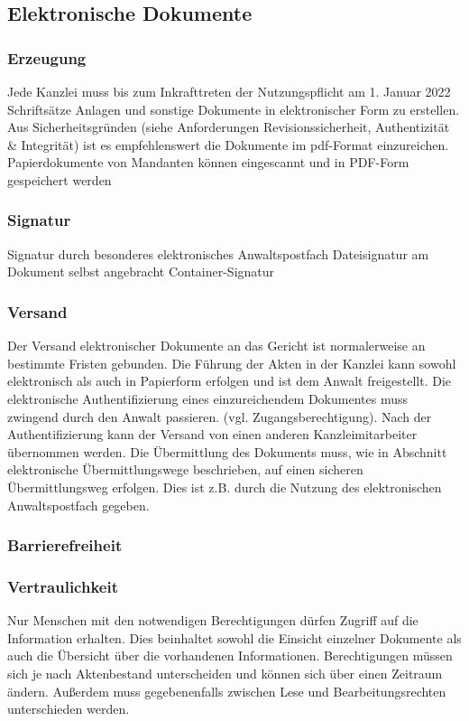 \subsection{Elektronische Dokumente}
\subsubsection*{Erzeugung}
Jede Kanzlei muss bis zum Inkrafttreten der Nutzungspflicht am 1. Januar 2022 Schriftsätze Anlagen und sonstige Dokumente in elektronischer Form zu erstellen. Aus Sicherheitsgründen (siehe Anforderungen Revisionssicherheit, Authentizität \& Integrität) ist es empfehlenswert die Dokumente im pdf-Format einzureichen.  Papierdokumente von Mandanten können eingescannt und in PDF-Form gespeichert werden


\subsubsection*{Signatur}
Signatur durch besonderes elektronisches Anwaltspostfach
Dateisignatur am Dokument selbst angebracht
Container-Signatur
\subsubsection*{Versand}
Der Versand elektronischer Dokumente an das Gericht ist normalerweise an bestimmte Fristen gebunden.
Die Führung der Akten in der Kanzlei kann sowohl elektronisch als auch in Papierform erfolgen und ist dem Anwalt freigestellt. Die elektronische Authentifizierung eines einzureichendem Dokumentes muss zwingend durch den Anwalt passieren. (vgl. Zugangsberechtigung). Nach der Authentifizierung kann der Versand von einen anderen Kanzleimitarbeiter übernommen werden. Die Übermittlung des Dokuments muss, wie in Abschnitt elektronische Übermittlungswege beschrieben, auf einen sicheren Übermittlungsweg erfolgen. Dies ist z.B. durch die Nutzung des elektronischen Anwaltspostfach gegeben.
\subsubsection*{Barrierefreiheit}

\subsubsection*{Vertraulichkeit}
Nur Menschen mit den notwendigen Berechtigungen dürfen Zugriff auf die Information erhalten. Dies beinhaltet sowohl die Einsicht einzelner Dokumente als auch die Übersicht über die vorhandenen Informationen. Berechtigungen müssen sich je nach Aktenbestand unterscheiden und können sich über einen Zeitraum ändern. Außerdem muss gegebenenfalls zwischen Lese und Bearbeitungsrechten unterschieden werden.
